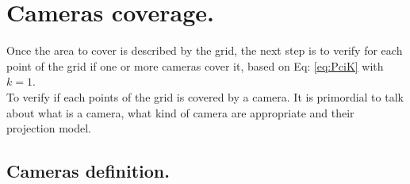 \section{ Cameras coverage.}\label{sec:CamerasCoverage}


Once the area to cover is described by the grid, the next step is to verify for each point of the grid if one or more cameras cover it, based on Eq: \ref{eq:PciK} with $k=1$.\\
To verify if each points of the grid is covered by a camera. It is primordial to talk about what is a camera, what kind of camera are appropriate and their projection model. 

\subsection{ Cameras definition.}\label{sec:CamerasDefinition}


